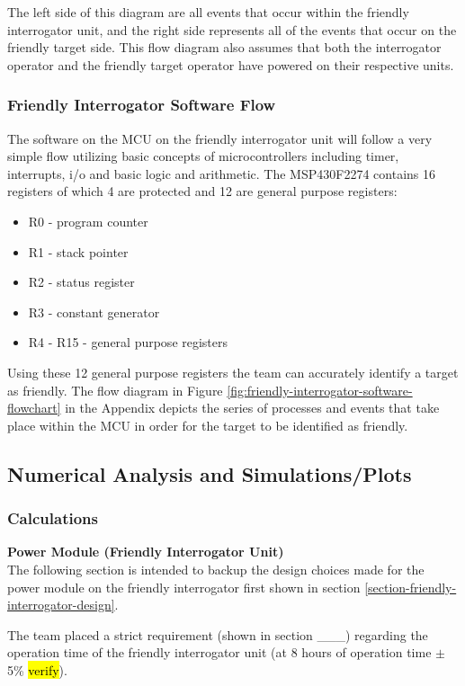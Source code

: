 \documentclass[letterpaper,10pt]{article}
\begin{document}
\begin{spacing}{1.15}
The left side of this diagram are all events that occur within the friendly interrogator unit, and the right side represents all of the events that occur on the friendly target side. This flow diagram also assumes that both the interrogator operator and the friendly target operator have powered on their respective units.

\subsubsection{Friendly Interrogator Software Flow}
The software on the MCU on the friendly interrogator unit will follow a very simple flow utilizing basic concepts of microcontrollers including timer, interrupts, i/o and basic logic and arithmetic. The MSP430F2274 contains 16 registers of which 4 are protected and 12 are general purpose registers:
\begin{itemize}
	\item R0 - program counter
	\item R1 - stack pointer 
	\item R2 - status register
	\item R3 - constant generator
	\item R4 - R15 - general purpose registers
\end{itemize}
Using these 12 general purpose registers the team can accurately identify a target as friendly. The flow diagram in Figure \ref*{fig:friendly-interrogator-software-flowchart} in the Appendix depicts the series of processes and events that take place within the MCU in order for the target to be identified as friendly. 

\subsection{Numerical Analysis and Simulations/Plots} \label{section-simulations-calculations}
\subsubsection{Calculations}
\normalsize\textbf{Power Module (Friendly Interrogator Unit)} \\
The following section is intended to backup the design choices made for the power module on the friendly interrogator first shown in section \ref{section-friendly-interrogator-design}.

The team placed a strict requirement (shown in section \_\_\_) regarding the operation time of the friendly interrogator unit (at 8 hours of operation time $\pm$ 5\% \hl{verify}).


\end{spacing}
\end{document}
